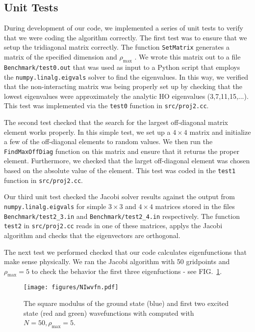 \documentclass[10pt,showpacs,preprintnumbers,footinbib,amsmath,amssymb,aps,prl,twocolumn,groupedaddress,superscriptaddress,showkeys]{revtex4-1}
\newcommand{\rhomax}{
	\ensuremath{ \rho _{\mathrm{max}}} }
\begin{document}
{ 
\subsection{Unit Tests}
During development of our code, we implemented a series of unit tests to verify that
we were coding the algorithm correctly. The first test was to ensure that we setup
the tridiagonal matrix correctly. The function \texttt{SetMatrix} generates a matrix
of the specified dimension and \rhomax. We wrote this matrix out to a file
\texttt{Benchmark/test0.out} that was used as input to a Python script that employs
the \texttt{numpy.linalg.eigvals} solver to find the eigenvalues. In this way, we verified
that the non-interacting matrix was being properly set up by checking that the lowest
eigenvalues were approximately the analytic HO eigenvalues (3,7,11,15,...). This test
was implemented via the \texttt{test0} function in \texttt{src/proj2.cc}.

The second test checked that the search for the largest off-diagonal matrix element
works properly. In this simple test, we set up a $4 \times 4$ matrix and initialize a
few of the off-diagonal elements to random values. We then run the \texttt{FindMaxOffDiag}
function on this matrix and ensure that it returns the proper element. Furthermore, we
checked that the larget off-diagonal element was chosen based on the absolute value
of the element. This test was coded in the \texttt{test1} function in \texttt{src/proj2.cc}.

Our third unit test checked the Jacobi solver results against the output from 
\texttt{numpy.linalg.eigvals} for simple $3 \times 3$ and $4 \times 4$ matrices stored in the
files \texttt{Benchmark/test2\_3.in} and \texttt{Benchmark/test2\_4.in} respectively. The
function \texttt{test2} in \texttt{src/proj2.cc} reads in one of these matrices, applys the
Jacobi algorithm and checks that the eigenvectors are orthogonal.

The next test we performed checked that our code calculates eigenfunctions that make
sense physically. We ran the Jacobi algorithm with 50 gridpoints and $\rhomax=5$ to
check the behavior the first three eigenfuctions - see FIG.~\ref{fig:NIwvfn}.

\begin{figure}
\centering
	\texttt{[image: figures/NIwvfn.pdf]}
	\caption{The square modulus of the ground state (blue) and first two excited state (red and
	green) wavefunctions with computed with $N=50, \rhomax=5$.}
	\label{fig:NIwvfn}
\end{figure}


}
\end{document}
